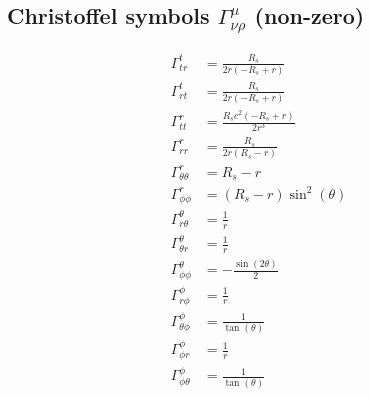 \documentclass{article}
\begin{document}
\subsection{Christoffel symbols $\Gamma^{\mu}_{\nu\rho}$ (non-zero)}
\begin{align}
\Gamma^{t}_{t r} &= \frac{R_{s}}{2 r \left(- R_{s} + r\right)} \\
\Gamma^{t}_{r t} &= \frac{R_{s}}{2 r \left(- R_{s} + r\right)} \\
\Gamma^{r}_{t t} &= \frac{R_{s} c^{2} \left(- R_{s} + r\right)}{2 r^{3}} \\
\Gamma^{r}_{r r} &= \frac{R_{s}}{2 r \left(R_{s} - r\right)} \\
\Gamma^{r}_{\theta \theta} &= R_{s} - r \\
\Gamma^{r}_{\phi \phi} &= \left(R_{s} - r\right) \sin^{2}{\left(\theta \right)} \\
\Gamma^{\theta}_{r \theta} &= \frac{1}{r} \\
\Gamma^{\theta}_{\theta r} &= \frac{1}{r} \\
\Gamma^{\theta}_{\phi \phi} &= - \frac{\sin{\left(2 \theta \right)}}{2} \\
\Gamma^{\phi}_{r \phi} &= \frac{1}{r} \\
\Gamma^{\phi}_{\theta \phi} &= \frac{1}{\tan{\left(\theta \right)}} \\
\Gamma^{\phi}_{\phi r} &= \frac{1}{r} \\
\Gamma^{\phi}_{\phi \theta} &= \frac{1}{\tan{\left(\theta \right)}} \\
\end{align}
\end{document}
